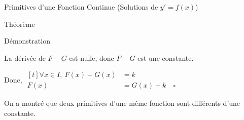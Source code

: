 \documentclass{cours}
\begin{document}
\begin{Gpartie}{Primitives d'une Fonction Continue \big(Solutions de $y'=f(x)$\big)}
\begin{Spartie}{Théorème}
\begin{SSpartie}{Démonstration}
\begin{enumerate}
                    La dérivée de $F-G$ est nulle, donc $F-G$ est une constante.
    
                    Donc, 
                    $\begin{aligned}[t]
                        \forall x\in I,\ F(x)-G(x)&=k \\
                        F(x)&=G(x)+k\quad\square
                    \end{aligned}$
    
                    On a montré que deux primitives d'une même fonction sont différents d'une constante.
                \end{enumerate}
            \end{SSpartie}
        \end{Spartie}
    \end{Gpartie}
    \pagebreak
\end{document}
